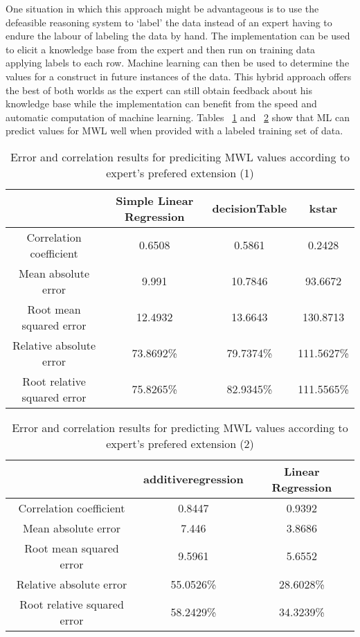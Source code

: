 One situation in which this approach might be advantageous is to use the defeasible reasoning system to `label' the data instead of an expert having to endure the labour of labeling the data by hand. The implementation can be used to elicit a knowledge base from the expert and then run on training data applying labels to each row. Machine learning can then be used to determine the values for a construct in future instances of the data. This hybrid approach offers the best of both worlds as the expert can still obtain feedback about his knowledge base while the implementation can benefit from the speed and automatic computation of machine learning. Tables ~\ref{tab:mlhybrid1} and ~\ref{tab:mlhybrid2} show that ML can predict values for MWL well when provided with a labeled training set of data.

\begin{table}[!htbp]
\centering
\begin{tabular}{|c|c|c|c|}
\hline
                            & Simple Linear Regression   & decisionTable  & kstar\\ \hline
Correlation coefficient     & 0.6508        & 0.5861         & 0.2428       \\
Mean absolute error         & 9.991        & 10.7846        & 93.6672       \\
Root mean squared error     & 12.4932      & 13.6643       & 130.8713       \\
Relative absolute error     & 73.8692\%    & 79.7374\%        & 111.5627\%  \\
Root relative squared error & 75.8265\%     & 82.9345\%      & 111.5565\%   \\
\hline
\end{tabular}
\caption{Error and correlation results for prediciting MWL values according to expert's prefered extension (1)}
\label{tab:mlhybrid1}
\end{table}


\begin{table}[!htbp]
\centering
\begin{tabular}{|c|c|c|}
\hline
                            & additiveregression & Linear Regression\\ \hline
Correlation coefficient     & 0.8447    & 0.9392 \\
Mean absolute error         & 7.446      & 3.8686 \\
Root mean squared error     & 9.5961    & 5.6552  \\
Relative absolute error     & 55.0526\% & 28.6028\%\\
Root relative squared error & 58.2429\%  & 34.3239\%\\
\hline
\end{tabular}
\caption{Error and correlation results for predicting MWL values according to expert's prefered extension (2)}
\label{tab:mlhybrid2}
\end{table}

